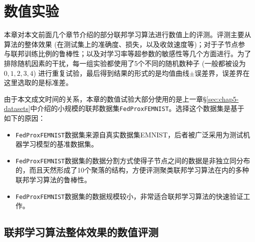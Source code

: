 \chapter{\hspace{-1mm}\bf 数值实验}
\label{chap6}


本章对本文前面几个章节介绍的部分联邦学习算法进行数值上的评测。评测主要从算法的整体效果 (在测试集上的准确度、损失，以及收敛速度等)；对于子节点参与联邦训练比例的鲁棒性；以及对学习率等超参数的敏感性等几个方面进行。为了排除随机因素的干扰，每一组实验都使用了5个不同的随机数种子 (一般都被设为$0, 1, 2, 3, 4$) 进行重复试验，最后得到结果的形式的是均值曲线$\pm$误差界，误差界在这里选取的是标准差。

由于本文成文时间的关系，本章的数值试验大部分使用的是上一章\S\ref{sec:chap5-datasets}中介绍的小规模的联邦数据集\texttt{FedProxFEMNIST}。选择这个数据集是基于如下的原因：
\begin{itemize}
    \item \texttt{FedProxFEMNIST}数据集来源自真实数据集EMNIST\cite{cohen2017emnist}，后者被广泛采用为测试机器学习模型的基准数据集。
    \item \texttt{FedProxFEMNIST}数据集的数据分割方式使得子节点之间的数据是非独立同分布的，而且天然形成了10个聚落的结构，方便评测聚类联邦学习算法\cite{Ghosh_2022_cfl, Sattler_2021_cfl}在内的多种联邦学习算法的鲁棒性。
    \item \texttt{FedProxFEMNIST}数据集的数据规模较小，非常适合联邦学习算法的快速验证工作。
\end{itemize}

\section{联邦学习算法整体效果的数值评测}
\label{sec:chap6-overall}


